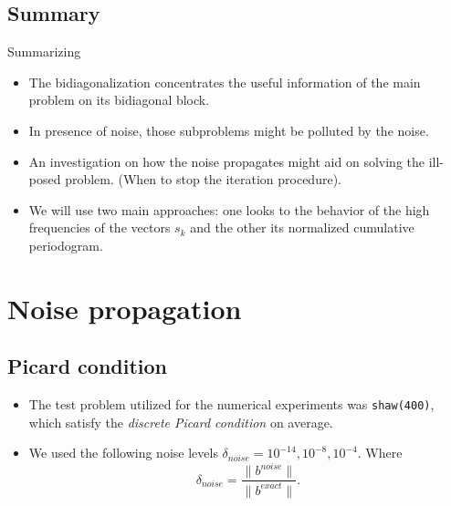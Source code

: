 \documentclass{beamer}
\begin{document}
\subsection{Summary}
\begin{frame}{Summarizing}
  \begin{itemize}
    \item The bidiagonalization concentrates the useful information of the
      main problem on its bidiagonal block.
      
    \item In presence of noise, those subproblems might be polluted by the
      noise.

    \item An investigation on how the noise propagates might aid on solving the
      ill-posed problem. (When to stop the iteration procedure).

    \item We will use two main approaches: one looks to the behavior of the
      high frequencies of the vectors $s_{k}$ and the other its normalized
      cumulative periodogram.
  \end{itemize}
\end{frame}

\section{Noise propagation}
\subsection{Picard condition}
\begin{frame}
  \begin{itemize}
    \item The test problem utilized for the numerical experiments was
      \texttt{shaw(400)}, which satisfy the \emph{discrete Picard condition} on
      average.

    \item We used the following noise levels $\delta_{noise} = 10^{-14}, 
      10^{-8}, 10^{-4}$. Where
      \begin{equation*}
	\delta_{noise} = \frac{\|b^{noise}\|}{\|b^{exact}\|}.
      \end{equation*}
  \end{itemize}
\end{frame}
\end{document}
